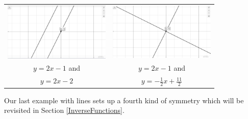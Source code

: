 \documentclass{ximera}
\begin{document}
\begin{ex}
\begin{enumerate}
\begin{center}

\begin{tabular}{cc}

\includegraphics[width=2in]{./AppLinesGraphics/A5Graph01.jpg} &

\hspace{0.75in} \includegraphics[width=2in]{./AppLinesGraphics/A5Graph02.jpg} \\

$y = 2x-1$ and  & 

 \hspace{0.75in}  $y = 2x-1$ and  \\
 
 \boldmath $y=2x-2$ & \hspace{0.75in} \boldmath $y= -\frac{1}{2} x + \frac{11}{2} $\\
 
\end{tabular}

\end{center}



\end{enumerate}


\end{ex}


\label{inversemidpoint}

Our last example with lines sets up a fourth kind of symmetry which will be revisited in Section \ref{InverseFunctions}.  
\end{document}
